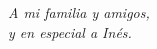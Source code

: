 
\thispagestyle{empty}
{}

\hfill
\vfill

\begin{flushright}
\itshape
A mi familia y amigos, \\
y en especial a Inés.
\end{flushright}

\vfill

\cleardoublepage
\endinput
